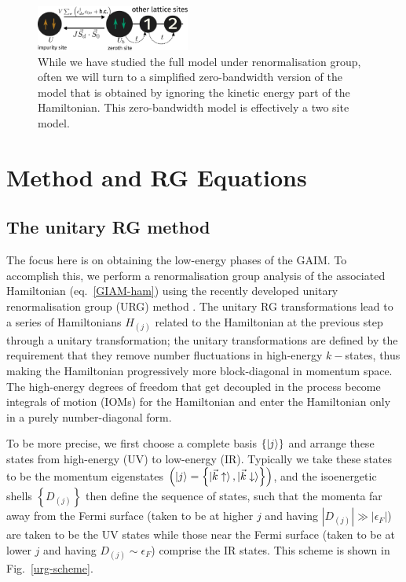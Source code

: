 \documentclass[reprint,superscriptaddress,floatfix]{revtex4-2}
\begin{document}
\begin{figure}[!htb]
	\centering
	\includegraphics[width=0.45\textwidth]{zeromode_bare.pdf}
	\caption{While we have studied the full model under renormalisation group, often we will turn to a simplified zero-bandwidth version of the model that is obtained by ignoring the kinetic energy part of the Hamiltonian. This zero-bandwidth model is effectively a two site model.}
	\label{zeromode-bare}
\end{figure}

\section{Method and RG Equations}

\subsection{The unitary RG method}
The focus here is on obtaining the low-energy phases of the GAIM. To accomplish this, we perform a renormalisation group analysis of the associated Hamiltonian (eq.~\ref{GIAM-ham}) using the recently developed unitary renormalisation group (URG) method \cite{anirbanmott1,anirbanmott2,anirbanurg1,anirbanurg2,siddharthacpi,santanukagome,1dhubjhep,Mukherjee_mott_merg,anirban_kondo}. The unitary RG transformations lead to a series of Hamiltonians \(H_{(j)}\) related to the Hamiltonian at the previous step through a unitary transformation; the unitary transformations are defined by the requirement that they remove number fluctuations in high-energy \(k-\)states, thus making the Hamiltonian progressively more block-diagonal in momentum space. The high-energy degrees of freedom that get decoupled in the process become integrals of motion (IOMs) for the Hamiltonian and enter the Hamiltonian only in a purely number-diagonal form.

To be more precise, we first choose a complete basis \(\left\{ \ket{j} \right\} \) and arrange these states from high-energy (UV) to low-energy (IR). Typically we take these states to be the momentum eigenstates \(\left(\ket{j} = \left\{\ket{\vec k \uparrow}, \ket{\vec k \downarrow}\right\}\right)\), and the isoenergetic shells \(\left\{D_{(j)}\right\}\) then define the sequence of states, such that the momenta far away from the Fermi surface (taken to be at higher \(j\) and having \(|D_{(j)}| \gg |\epsilon_F|\)) are taken to be the UV states while those near the Fermi surface (taken to be at lower \(j\) and having \(D_{(j)} \sim \epsilon_F\)) comprise the IR states. This scheme is shown in Fig.~\ref{urg-scheme}.
\end{document}

